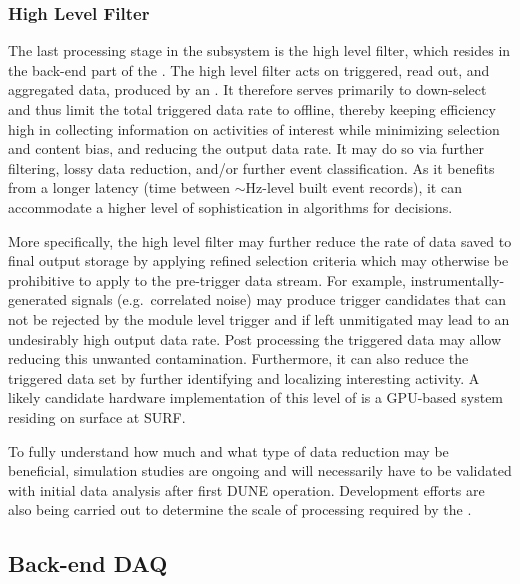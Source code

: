 
\subsubsection{High Level Filter}
\label{sec:daq:design-data-reduction}

The last processing stage in the  subsystem is the
high level filter, which resides in the back-end part of the .
The high level filter acts on triggered, read out, and aggregated data,
produced by an . 
It therefore serves primarily to down-select and thus
limit the total triggered data rate to offline, thereby keeping %
efficiency high in collecting information on activities of interest
while minimizing selection and content bias, and reducing the output data
rate. It may do so via 
further filtering, lossy data reduction, and/or further event
classification. As it benefits from a longer latency (time between
$\sim$Hz-level built event records), it can accommodate a higher level of
sophistication in algorithms for  decisions.

More specifically, the high level filter may further reduce the rate of data
saved to final output storage by applying refined selection criteria which may
otherwise be prohibitive to apply to the pre-trigger data stream.
For example, instrumentally-generated signals (e.g.~correlated noise) may
produce trigger candidates that can not be rejected by the module level trigger
and if left unmitigated may lead to an undesirably high output data rate. 
Post processing the triggered data may allow reducing this unwanted
contamination.
Furthermore, it can also reduce the triggered data set by further identifying
and localizing interesting activity.
A likely candidate hardware implementation of this level of  is a
GPU-based system residing on surface at SURF.

To fully understand how much and what type of data reduction may be beneficial,
simulation studies are ongoing  and will necessarily have to be
validated with initial data analysis after first DUNE  operation.
Development efforts are also being carried out to determine the scale of
processing required by the .


\subsection{Back-end DAQ}
\label{sec:daq:design-backend}

